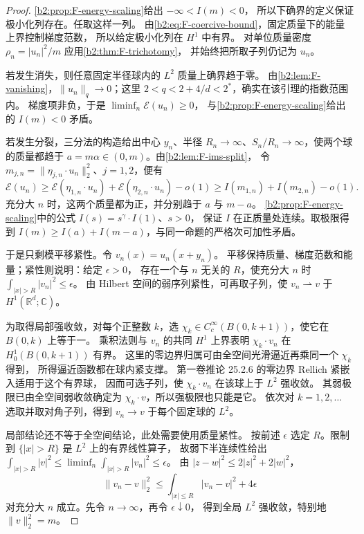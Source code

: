 \begin{proof}
\cref{b2:prop:F-energy-scaling}给出 \(-\infty<I(m)<0\)，
所以下确界的定义保证极小化列存在。任取这样一列。
由\eqref{b2:eq:F-coercive-bound}，固定质量下的能量上界控制梯度范数，
所以给定极小化列在 \(H^1\) 中有界。
对单位质量密度 \(\rho_n=|u_n|^2/m\) 应用\cref{b2:thm:F-trichotomy}，
并始终把所取子列仍记为 \(u_n\)。

若发生消失，则任意固定半径球内的 \(L^2\) 质量上确界趋于零。
由\cref{b2:lem:F-vanishing}，\(\|u_n\|_q\to0\)；这里
\(2<q<2+4/d<2^*\)，确实在该引理的指数范围内。
梯度项非负，于是 \(\liminf_n\mathcal E(u_n)\ge0\)，
与\cref{b2:prop:F-energy-scaling}给出的 \(I(m)<0\) 矛盾。

若发生分裂，三分法的构造给出中心 \(y_n\)、半径
\(R_n\to\infty\)、\(S_n/R_n\to\infty\)，使两个球的质量都趋于
\(a=m\alpha\in(0,m)\)。由\cref{b2:lem:F-ims-split}，
令 \(m_{j,n}=\|\eta_{j,n}\cdot u_n\|_2^2\)、\(j=1,2\)，便有
\[
 \mathcal E(u_n)\ge
 \mathcal E(\eta_{1,n}\cdot u_n)+\mathcal E(\eta_{2,n}\cdot u_n)-o(1)
 \ge I(m_{1,n})+I(m_{2,n})-o(1).
\]
充分大 \(n\) 时，这两个质量都为正，并分别趋于 \(a\) 与 \(m-a\)。
\cref{b2:prop:F-energy-scaling}中的公式 \(I(s)=s^\gamma\cdot I(1)\)、\(s>0\)，
保证 \(I\) 在正质量处连续。取极限得到
\(I(m)\ge I(a)+I(m-a)\)，与同一命题的严格次可加性矛盾。

于是只剩模平移紧性。令 \(v_n(x)=u_n(x+y_n)\)。
平移保持质量、梯度范数和能量；紧性则说明：给定 \(\epsilon>0\)，
存在一个与 \(n\) 无关的 \(R\)，使充分大 \(n\) 时
\(\int_{|x|>R}|v_n|^2\le\epsilon\)。
由 Hilbert 空间的弱序列紧性，可再取子列，使
\(v_n\rightharpoonup v\) 于 \(H^1(\mathbb R^d;\mathbb C)\)。

为取得局部强收敛，对每个正整数 \(k\)，选
\(\chi_k\in C_c^\infty(B(0,k+1))\)，使它在 \(B(0,k)\) 上等于一。
乘积法则与 \(v_n\) 的共同 \(H^1\) 上界表明
\(\chi_k\cdot v_n\) 在 \(H_0^1(B(0,k+1))\) 有界。
这里的零边界归属可由全空间光滑逼近再乘同一个 \(\chi_k\) 得到，
所得逼近函数都在球内紧支撑。
第一卷推论 25.2.6 的零边界 Rellich 紧嵌入适用于这个有界球，
因而可选子列，使 \(\chi_k\cdot v_n\) 在该球上于 \(L^2\) 强收敛。
其弱极限已由全空间弱收敛确定为 \(\chi_k\cdot v\)，所以强极限也只能是它。
依次对 \(k=1,2,\ldots\) 选取并取对角子列，得到
\(v_n\to v\) 于每个固定球的 \(L^2\)。

局部结论还不等于全空间结论，此处需要使用质量紧性。
按前述 \(\epsilon\) 选定 \(R\)。限制到 \(\{|x|>R\}\) 是 \(L^2\) 上的有界线性算子，
故弱下半连续性给出
\(\int_{|x|>R}|v|^2\le\liminf_n\int_{|x|>R}|v_n|^2\le\epsilon\)。
由 \(|z-w|^2\le2|z|^2+2|w|^2\)，
\[
 \|v_n-v\|_2^2
 \le\int_{|x|\le R}|v_n-v|^2+4\epsilon
\]
对充分大 \(n\) 成立。先令 \(n\to\infty\)，再令 \(\epsilon\downarrow0\)，
得到全局 \(L^2\) 强收敛，特别地 \(\|v\|_2^2=m\)。


\end{proof}
